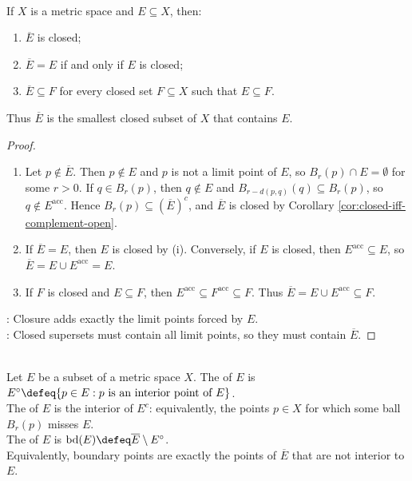 \begin{theorem} \label{thm:closure-smallest-closed-containing-set} \\
If $X$ is a metric space and $E\subseteq X$, then:
\begin{enumerate}[label=(\roman*)]
\setlength{\itemsep}{0pt}
\item $\overline{E}$ is closed;
\item $\overline{E}=E$ if and only if $E$ is closed;
\item $\overline{E}\subseteq F$ for every closed set $F\subseteq X$ such that $E\subseteq F$.
\end{enumerate}
Thus $\overline{E}$ is the smallest closed subset of $X$ that contains $E$.
\begin{proof}
\begin{enumerate}[label=(\roman*)]
\setlength{\itemsep}{0pt}
\item Let $p\notin\overline{E}$. Then $p\notin E$ and $p$ is not a limit point of $E$, so $B_r(p)\cap E=\emptyset$ for some $r>0$. If $q\in B_r(p)$, then $q\notin E$ and $B_{r-d(p,q)}(q)\subseteq B_r(p)$, so $q\notin E^{\operatorname{acc}}$. Hence $B_r(p)\subseteq(\overline{E})^c$, and $\overline{E}$ is closed by Corollary \ref{cor:closed-iff-complement-open}.
\item If $\overline{E}=E$, then $E$ is closed by (i). Conversely, if $E$ is closed, then $E^{\operatorname{acc}}\subseteq E$, so $\overline{E}=E\cup E^{\operatorname{acc}}=E$.
\item If $F$ is closed and $E\subseteq F$, then $E^{\operatorname{acc}}\subseteq F^{\operatorname{acc}}\subseteq F$. Thus $\overline{E}=E\cup E^{\operatorname{acc}}\subseteq F$.
\end{enumerate}
: Closure adds exactly the limit points forced by $E$.\\
: Closed supersets must contain all limit points, so they must contain $\overline{E}$.
\end{proof}
\end{theorem}

\begin{definition} \label{def:interior-closure-boundary} \\
Let $E$ be a subset of a metric space $X$. The  of $E$ is $E^\circ\defeq\{p\in E:p\text{ is an interior point of }E\}$.\\
The  of $E$ is the interior of $E^c$: equivalently, the points $p\in X$ for which some ball $B_r(p)$ misses $E$.\\
The  of $E$ is $\operatorname{bd}(E)\defeq\overline{E}\setminus E^\circ$.\\
Equivalently, boundary points are exactly the points of $\overline{E}$ that are not interior to $E$.
\end{definition}

